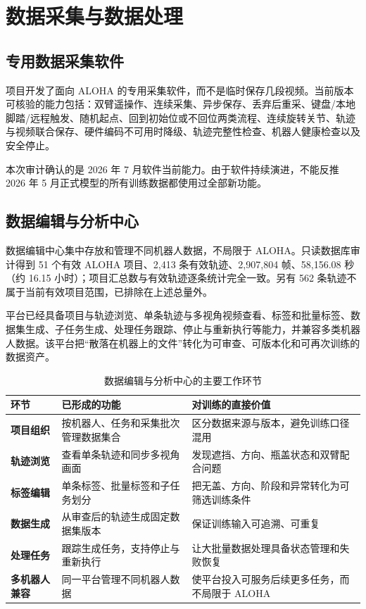\chapter{数据采集与数据处理}

\section{专用数据采集软件}

项目开发了面向 ALOHA 的专用采集软件，而不是临时保存几段视频。当前版本可核验的能力包括：双臂遥操作、连续采集、异步保存、丢弃后重采、键盘/本地脚踏/远程触发、随机起点、回到初始位或不回位两类流程、连续旋转关节、轨迹与视频联合保存、硬件编码不可用时降级、轨迹完整性检查、机器人健康检查以及安全停止。


本次审计确认的是 2026 年 7 月软件当前能力。由于软件持续演进，不能反推 2026 年 5 月正式模型的所有训练数据都使用过全部新功能。

\section{数据编辑与分析中心}

数据编辑中心集中存放和管理不同机器人数据，不局限于 ALOHA。只读数据库审计得到 51 个有效 ALOHA 项目、2,413 条有效轨迹、2,907,804 帧、58,156.08 秒（约 16.15 小时）；项目汇总数与有效轨迹逐条统计完全一致。另有 562 条轨迹不属于当前有效项目范围，已排除在上述总量外。

平台已经具备项目与轨迹浏览、单条轨迹与多视角视频查看、标签和批量标签、数据集生成、子任务生成、处理任务跟踪、停止与重新执行等能力，并兼容多类机器人数据。该平台把“散落在机器上的文件”转化为可审查、可版本化和可再次训练的数据资产。

\begin{table}[H]
\centering
\caption{数据编辑与分析中心的主要工作环节}
\begin{tabularx}{\textwidth}{>{\bfseries}p{30mm}p{45mm}X}
\toprule
环节 & 已形成的功能 & 对训练的直接价值\\
\midrule
项目组织 & 按机器人、任务和采集批次管理数据集合 & 区分数据来源与版本，避免训练口径混用\\
轨迹浏览 & 查看单条轨迹和同步多视角画面 & 发现遮挡、方向、瓶盖状态和双臂配合问题\\
标签编辑 & 单条标签、批量标签和子任务划分 & 把无盖、方向、阶段和异常转化为可筛选训练条件\\
数据生成 & 从审查后的轨迹生成固定数据集版本 & 保证训练输入可追溯、可重复\\
处理任务 & 跟踪生成任务，支持停止与重新执行 & 让大批量数据处理具备状态管理和失败恢复\\
多机器人兼容 & 同一平台管理不同机器人数据 & 使平台投入可服务后续更多任务，而不局限于 ALOHA\\
\bottomrule
\end{tabularx}
\end{table}

